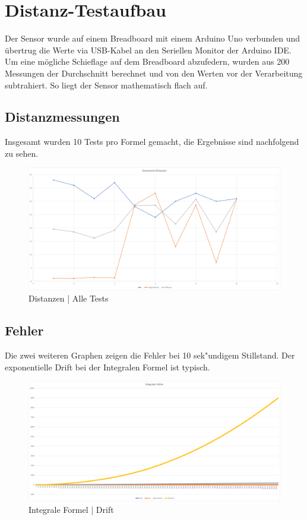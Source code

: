 \section{Distanz-Testaufbau}
Der Sensor wurde auf einem Breadboard mit einem Arduino Uno verbunden und übertrug die Werte
via USB-Kabel an den Seriellen Monitor der Arduino IDE. Um eine mögliche Schieflage auf dem
Breadboard abzufedern, wurden aus 200 Messungen der Durchschnitt berechnet und von den Werten vor
der Verarbeitung subtrahiert. So liegt der Sensor mathematisch flach auf. \\

\subsection{Distanzmessungen}
Insgesamt wurden 10 Tests pro Formel gemacht, die Ergebnisse sind nachfolgend zu sehen. \\

\begin{figure} [h]
    \centering
    \includegraphics[width = 15cm]{Bilder/_DistanzVergleich}
    \caption{Distanzen | Alle Tests}
    \end{figure}

\subsection{Fehler}
Die zwei weiteren Graphen zeigen die Fehler bei 10 sek"undigem Stillstand. Der exponentielle Drift 
bei der Integralen Formel ist typisch. 

\begin{figure} [h]
    \centering
    \includegraphics[width = 15cm]{Bilder/_integralDistance001}
    \caption{Integrale Formel | Drift}
    \end{figure}

